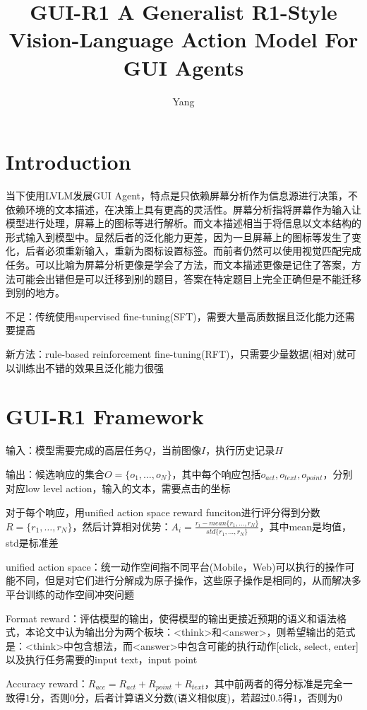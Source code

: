 \documentclass[a4paper,12pt]{article}
\title{GUI-R1  A Generalist R1-Style Vision-Language Action Model For GUI Agents}
\author{Yang}
\begin{document}
\maketitle
\section{Introduction}
当下使用LVLM发展GUI Agent，特点是只依赖屏幕分析作为信息源进行决策，不依赖环境的文本描述，在决策上具有更高的灵活性。屏幕分析指将屏幕作为输入让模型进行处理，屏幕上的图标等进行解析。而文本描述相当于将信息以文本结构的形式输入到模型中。显然后者的泛化能力更差，因为一旦屏幕上的图标等发生了变化，后者必须重新输入，重新为图标设置标签。而前者仍然可以使用视觉匹配完成任务。可以比喻为屏幕分析更像是学会了方法，而文本描述更像是记住了答案，方法可能会出错但是可以迁移到别的题目，答案在特定题目上完全正确但是不能迁移到别的地方。

不足：传统使用supervised fine-tuning(SFT)，需要大量高质数据且泛化能力还需要提高

新方法：rule-based reinforcement fine-tuning(RFT)，只需要少量数据(相对)就可以训练出不错的效果且泛化能力很强

\section{GUI-R1 Framework}
输入：模型需要完成的高层任务$Q$，当前图像$I$，执行历史记录$H$

输出：候选响应的集合$O = \{o_1, \dots, o_N\}$，其中每个响应包括$o_{act}, o_{text}, o_{point}$，分别对应low level action，输入的文本，需要点击的坐标

对于每个响应，用unified action space reward funciton进行评分得到分数$R = \{r_1, \dots, r_N\}$，然后计算相对优势：$A_i = \frac{r_i - mean\{r_1, \dots, r_N\}}{std\{r_1, \dots, r_N\}}$，其中mean是均值，std是标准差

unified action space：统一动作空间指不同平台(Mobile，Web)可以执行的操作可能不同，但是对它们进行分解成为原子操作，这些原子操作是相同的，从而解决多平台训练的动作空间冲突问题

Format reward：评估模型的输出，使得模型的输出更接近预期的语义和语法格式，本论文中认为输出分为两个板块：<think>和<answer>，则希望输出的范式是：<think>中包含想法，而<answer>中包含可能的执行动作[click, select, enter]以及执行任务需要的input text，input point

Accuracy reward：$R_{acc} = R_{act} + R_{point} + R_{text}$，其中前两者的得分标准是完全一致得$1$分，否则$0$分，后者计算语义分数(语义相似度)，若超过$0.5$得$1$，否则为$0$
\end{document}
